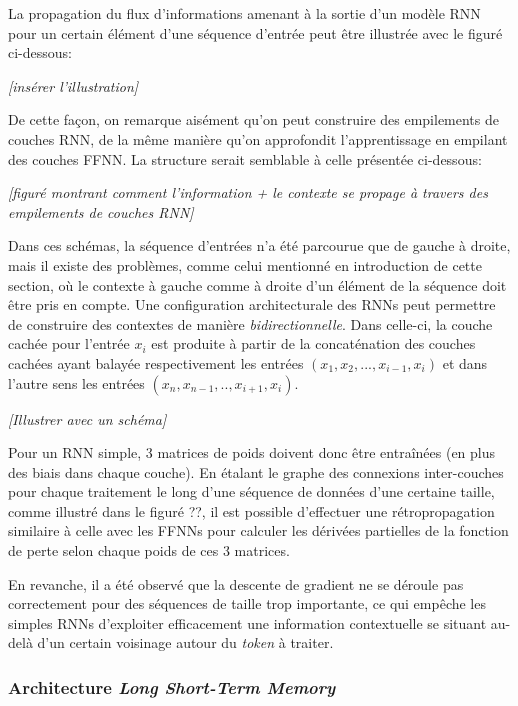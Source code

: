 \documentclass[12pt, french, twoside]{report}
\begin{document}
La propagation du flux d'informations amenant à la sortie d'un modèle RNN pour un certain élément d'une séquence d'entrée peut être illustrée avec le figuré ci-dessous:

\textit{[insérer l'illustration]}\citep[chap.~9, p. 1-4]{jurafsky}

De cette façon, on remarque aisément qu'on peut construire des empilements de couches RNN, de la même manière qu'on approfondit l'apprentissage en empilant des couches FFNN. La structure serait semblable à celle présentée ci-dessous:

\textit{[figuré montrant comment l'information + le contexte se propage à travers des empilements de couches RNN]}

Dans ces schémas, la séquence d'entrées n'a été parcourue que de gauche à droite, mais il existe des problèmes, comme celui mentionné en introduction de cette section, où le contexte à gauche comme à droite d'un élément de la séquence doit être pris en compte. Une configuration architecturale des RNNs peut permettre de construire des contextes de manière \textit{bidirectionnelle}. Dans celle-ci, la couche cachée pour l'entrée $x_i$ est produite à partir de la concaténation des couches cachées ayant balayée respectivement les entrées $(x_1, x_2, ..., x_{i-1}, x_{i})$ et dans l'autre sens les entrées $(x_n, x_{n-1}, .., x_{i+1}, x_i)$.

\textit{[Illustrer avec un schéma]}\citep[chap.~9, p. 11-13]{jurafsky}

\vspace{12pt}
Pour un RNN simple, 3 matrices de poids doivent donc être entraînées (en plus des biais dans chaque couche). En étalant le graphe des connexions inter-couches pour chaque traitement le long d'une séquence de données d'une certaine taille, comme illustré dans le figuré ??, il est possible d'effectuer une rétropropagation similaire à celle avec les FFNNs pour calculer les dérivées partielles de la fonction de perte selon chaque poids de ces 3 matrices.\citep[chap.~9, p. 4-5]{jurafsky}

En revanche, il a été observé que la descente de gradient ne se déroule pas correctement pour des séquences de taille trop importante, ce qui empêche les simples RNNs d'exploiter efficacement une information contextuelle se situant au-delà d'un certain voisinage autour du \textit{token} à traiter.\citep[p. 25-26]{fourrier}

\subsubsection{Architecture \textit{Long Short-Term Memory}}
\end{document}
